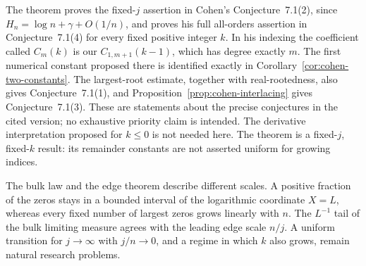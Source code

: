 The theorem proves the fixed-$j$ assertion in Cohen's
Conjecture~7.1(2), since $H_n=\log n+\gamma+O(1/n)$, and proves
his full all-orders assertion in Conjecture~7.1(4) for every fixed
positive integer $k$.  In his indexing the coefficient called
$C_m(k)$ is our $C_{1,m+1}(k-1)$, which has degree exactly $m$.
The first numerical constant proposed there is identified exactly
in Corollary~\ref{cor:cohen-two-constants}.
The largest-root estimate, together with real-rootedness, also gives
Conjecture~7.1(1), and Proposition~\ref{prop:cohen-interlacing}
gives Conjecture~7.1(3).  These are statements about the precise
conjectures in the cited version; no exhaustive priority claim is
intended.  The derivative interpretation proposed for $k\leq0$
is not needed here.  The theorem is a fixed-$j$, fixed-$k$ result:
its remainder constants are not asserted uniform for growing indices.

The bulk law and the edge theorem describe different scales.
A positive fraction of the zeros stays in a bounded interval of the
logarithmic coordinate $X=L$, whereas every fixed number of largest
zeros grows linearly with $n$.  The $L^{-1}$ tail of the bulk limiting
measure agrees with the leading edge scale $n/j$.  A uniform
transition for $j\to\infty$ with $j/n\to0$, and a regime in which
$k$ also grows, remain natural research problems.
